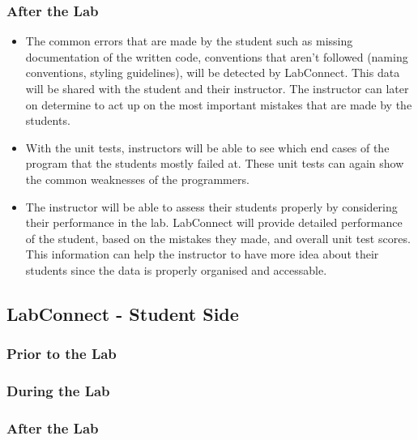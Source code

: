 \documentclass[a4paper, 12pt]{article}
\begin{document}
    \subsubsection{After the Lab}
    
    \begin{itemize}
        \item The common errors that are made by the student such as missing documentation 
        of the written code, conventions that aren't followed (naming conventions, styling 
        guidelines), will be detected by LabConnect. This data will be shared with the student
        and their instructor. The instructor can later on determine to act up on the most
        important mistakes that are made by the students.
        \item With the unit tests, instructors will be able to see which end cases of the program
        that the students mostly failed at. These unit tests can again show the common weaknesses
        of the programmers.
        \item The instructor will be able to assess their students properly by considering their
        performance in the lab. LabConnect will provide detailed performance of the student, 
        based on the mistakes they made, and overall unit test scores. This information can help
        the instructor to have more idea about their students since the data is properly organised
        and accessable.
    \end{itemize}
    
    \subsection{LabConnect - Student Side}
    
    \subsubsection{Prior to the Lab}
    
    
    \subsubsection{During the Lab}
    
    
    \subsubsection{After the Lab}
    
\end{document}
